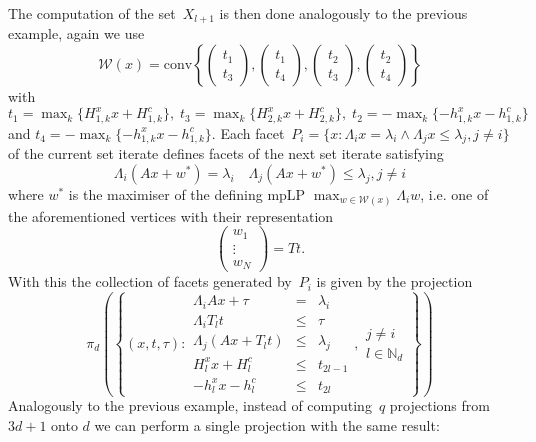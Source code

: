 \documentclass[a4paper, 12pt, twoside]{article}
\theoremstyle{definition}
\numberwithin{equation}{section}
\providecommand{\conv}{\text{conv}}
\begin{document}
The computation of the set~$X_{l+1}$ is then done analogously to the previous example, again we use 
%
$$
  \mathcal W(x) = \conv\left\{\begin{pmatrix}t_1\\ t_3\end{pmatrix},\begin{pmatrix}t_1\\ t_4\end{pmatrix},
  \begin{pmatrix} t_2\\ t_3\end{pmatrix},\begin{pmatrix}t_2\\ t_4\end{pmatrix}
  \right\}
$$
%
with $t_1=\max_k\{H_{1,k}^x x+H_{1,k}^c\},\; t_3=\max_k\{H_{2,k}^x x+H_{2,k}^c\},\; t_2=-\max_k\{-h_{1,k}^x x-h_{1,k}^c\}$ and $t_4=-\max_k\{-h_{1,k}^x x-h_{1,k}^c\}$.
%
Each facet~$P_i=\{x:\Lambda_i x=\lambda_i\wedge\Lambda_jx\leq\lambda_j,j\neq i\}$ of the current set iterate defines facets of the next set iterate satisfying
%
\begin{equation}
\Lambda_i(Ax+w^\ast)=\lambda_i\quad \Lambda_j(Ax+w^\ast)\leq\lambda_j,j\neq i
\end{equation}
%
where $w^\ast$ is the maximiser of the defining mpLP $\max_{w\in\mathcal W(x)}\Lambda_iw$, i.e. one of the aforementioned vertices with their representation
%
$$
  \begin{pmatrix} w_1\\ \vdots \\ w_N\end{pmatrix}= Tt.
$$
%
With this the collection of facets generated by~$P_i$ is given by the projection
%
\begin{equation}
  \pi_d\left(\left\{(x,t,\tau):\begin{array}{rcl}
  \Lambda_iAx+\tau&=&\lambda_i\\
  \Lambda_i T_lt&\leq&\tau\\
  \Lambda_j(Ax+T_lt)&\leq&\lambda_j\\
  H_l^x x + H_l^c&\leq&t_{2l-1}\\
  -h_l^x x - h_l^c&\leq&t_{2l}
  \end{array}, \begin{array}{l}
  j\neq i\\
  l\in\mathbb N_d\end{array}
  \right\}\right)
\end{equation}
%
Analogously to the previous example, instead of computing~$q$ projections from $3d+1$ onto $d$ we can perform a single projection with the same result:
\end{document}
